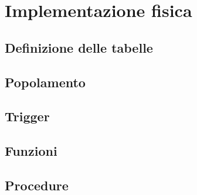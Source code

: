 \section{Implementazione fisica}
\subsection{Definizione delle tabelle}
\subsection{Popolamento}
\subsection{Trigger}
\subsection{Funzioni}
\subsection{Procedure}